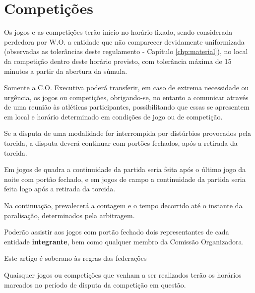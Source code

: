 {\let\clearpage\relax \chapter{Competições}}

\begin{article}
	Os jogos e as competições terão início no horário fixado, sendo considerada perdedora por W.O. a entidade que não comparecer devidamente uniformizada (observadas as tolerâncias deste regulamento - Capítulo \ref{chp:material}), no local da competição dentro deste horário previsto, com tolerância máxima de 15 minutos a partir da abertura da súmula.
\end{article}

\begin{article}
	Somente a C.O. Executiva poderá transferir, em caso de extrema necessidade ou urgência, os jogos ou competições, obrigando-se, no entanto a comunicar através de uma reunião às atléticas participantes, possibilitando que essas se apresentem em local e horário determinado em condições de jogo ou de competição.
\end{article}

\begin{article}
	\label{art:jogos.interromp}
	Se a disputa de uma modalidade for interrompida por distúrbios provocados pela torcida, a disputa deverá continuar com portões fechados, após a retirada da torcida.

	\begin{xparagraph}
		Em jogos de quadra a continuidade da partida seria feita após o último jogo da noite com portão fechado, e em jogos de campo a continuidade da partida seria feita logo após a retirada da torcida.
	\end{xparagraph}

	\begin{xparagraph}
		Na continuação, prevalecerá a contagem e o tempo decorrido até o instante da paralisação, determinados pela arbitragem.
	\end{xparagraph}

	\begin{xparagraph}
		Poderão assistir aos jogos com portão fechado dois representantes de cada entidade \textbf{integrante}, bem como qualquer membro da Comissão Organizadora.
	\end{xparagraph}

	\begin{xparagraph}
		Este artigo é soberano às regras das federações
	\end{xparagraph}
\end{article}

\begin{article}
	Quaisquer jogos ou competições que venham a ser realizados terão os horários marcados no período de disputa da competição em questão.
\end{article}
